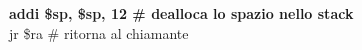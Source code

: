 \documentclass[../main.tex]{subfiles}
\begin{document}
{    \textbf{\hspace*{0cm} \hspace*{0cm} \hspace*{0cm} \hspace*{0cm} addi \$sp, \$sp, 12 \hspace*{0cm} \hspace*{0cm} \# dealloca lo spazio nello stack} \\
    \hspace*{0cm} \hspace*{0cm} \hspace*{0cm} \hspace*{0cm} jr \$ra \hspace*{0cm} \hspace*{0cm} \hspace*{0cm} \hspace*{0cm} \hspace*{0cm} \hspace*{0cm} \hspace*{0cm} \hspace*{0cm} \hspace*{0cm} \hspace*{0cm} \hspace*{0cm} \hspace*{0cm} \hspace*{0cm} \# ritorna al chiamante \\
}
\end{document}
